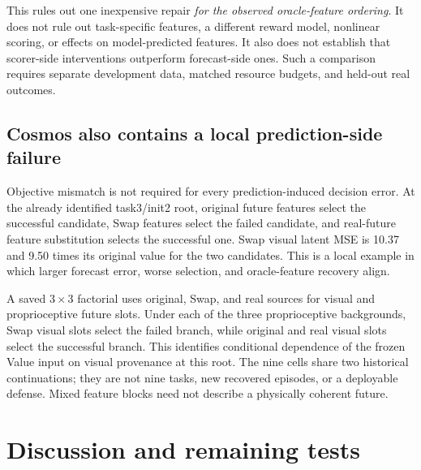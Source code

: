 \documentclass[11pt]{article}
\begin{document}
This rules out one inexpensive repair \emph{for the observed oracle-feature
ordering}. It does not rule out task-specific features, a different reward
model, nonlinear scoring, or effects on model-predicted features. It also does
not establish that scorer-side interventions outperform forecast-side ones.
Such a comparison requires separate development data, matched resource budgets,
and held-out real outcomes.

\subsection{Cosmos also contains a local prediction-side failure}
Objective mismatch is not required for every prediction-induced decision
error. At the already identified task3/init2 root, original future features
select the successful candidate, Swap features select the failed candidate,
and real-future feature substitution selects the successful one. Swap visual
latent MSE is 10.37 and 9.50 times its original value for the two candidates.
This is a local example in which larger forecast error, worse selection, and
oracle-feature recovery align.

A saved $3\times3$ factorial uses original, Swap, and real sources for visual
and proprioceptive future slots. Under each of the three proprioceptive
backgrounds, Swap visual slots select the failed branch, while original and
real visual slots select the successful branch. This identifies conditional
dependence of the frozen Value input on visual provenance at this root.
The nine cells share two historical continuations; they are not nine tasks,
new recovered episodes, or a deployable defense. Mixed feature blocks need
not describe a physically coherent future.





\section{Discussion and remaining tests}
\label{sec:discussion}
\end{document}
